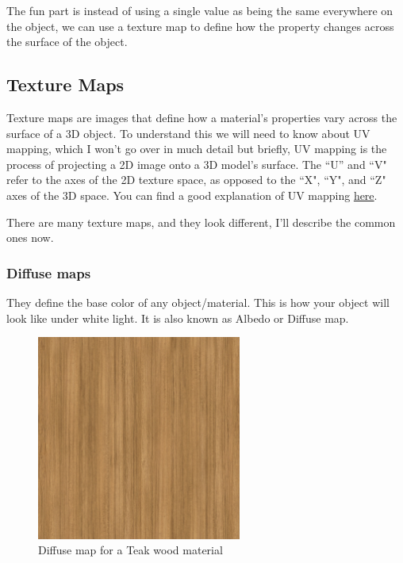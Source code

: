 \documentclass{article}
\begin{document}
The fun part is instead of using a single value as being the same everywhere on the object, we can use a texture map to define how the property changes across the surface of the object.

\subsection{Texture Maps}
Texture maps are images that define how a material's properties vary across the surface of a 3D object. To understand this we will need to know about UV mapping, which I won't go over in much detail but briefly, UV mapping is the process of projecting a 2D image onto a 3D model's surface. The ``U'' and ``V" refer to the axes of the 2D texture space, as opposed to the ``X", ``Y", and ``Z" axes of the 3D space. You can find a good explanation of UV mapping \href{https://youtu.be/XeBUfMKKZDo?si=PByk-2xxJS7TuU2l}{here}.

There are many texture maps, and they look different, I'll describe the common ones now.

\subsubsection{Diffuse maps}
They define the base color of any object/material. This is how your object will look like under white light. It is also known as Albedo or Diffuse map. 

\begin{figure}[h]
    \centering
    \includegraphics[width=0.6\textwidth]{day2images/Teak_4k_Albedo.jpg}
    \caption{Diffuse map for a Teak wood material}
    \label{fig:diffuse_map}
\end{figure}
\end{document}
